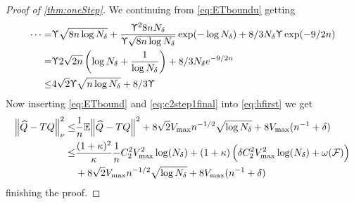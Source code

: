\begin{proof}[Proof of \cref{thm:oneStep}]
  We continuing from \cref{eq:ETboundu} getting
  \begin{align}
    \dots = & \Upupsilon \sqrt{8 n \log N_\delta}
    + \frac{\Upupsilon^2 8 n N_\delta}{\Upupsilon \sqrt{8 n \log N_\delta}}
    \exp(-\log N_\delta) + 8/3 N_\delta \Upupsilon \exp(-9/2 n)
    \\ = & \Upupsilon 2 \sqrt{2n} \left( \log N_\delta + \frac{1}{\log N_\delta} \right)
    + 8/3 N_\delta e^{-9/2 n}
    \\ \leq & 4 \sqrt{2} \Upupsilon \sqrt{n \log N_\delta} + 8/3 \Upupsilon
    \label{eq:ETbound}
  \end{align}
  Now inserting \cref{eq:ETbound} and \cref{eq:c2step1final} into \cref{eq:hfirst}
  we get
  \begin{align}
    \norm{\widehat{Q} - TQ}^2_\nu \leq & \frac{1}{n} \mathbb{E} \norm{\widehat{Q} - TQ}^2
    + 8 \sqrt{2} V_{\max} n^{-1/2} \sqrt{\log N_\delta}
    + 8 V_{\max} (n^{-1} + \delta)
    \\ \leq & \frac{(1+\kappa)^2}{\kappa} \frac{1}{n}
    C_2^2 V_{\max}^2 \log(N_\delta)
    + (1 + \kappa) \left( \delta C_2^2 V_{\max}^2 \log(N_\delta)
    + \omega(\mathcal{F}) \right) 
    \notag
    \\ & + 8 \sqrt{2} V_{\max} n^{-1/2} \sqrt{\log N_\delta}
    + 8 V_{\max} (n^{-1} + \delta)
    \label{eq:C2final}
  \end{align}
  finishing the proof.
\end{proof}



